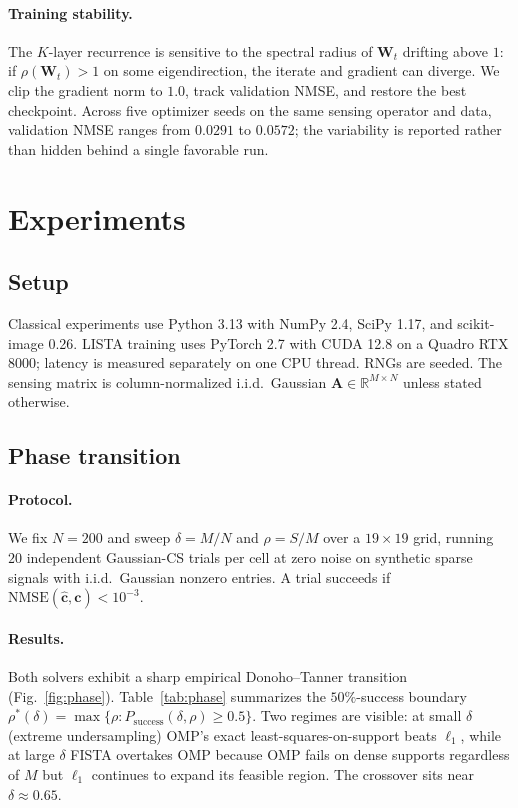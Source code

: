\documentclass{article}
\begin{document}
\paragraph{Training stability.} The $K$-layer recurrence is sensitive to the spectral radius of $\boldsymbol{W}_t$ drifting above $1$: if $\rho(\boldsymbol{W}_t) > 1$ on some eigendirection, the iterate and gradient can diverge. We clip the gradient norm to $1.0$, track validation NMSE, and restore the best checkpoint. Across five optimizer seeds on the same sensing operator and data, validation NMSE ranges from $0.0291$ to $0.0572$; the variability is reported rather than hidden behind a single favorable run.

\section{Experiments}
\label{sec:experiments}

\subsection{Setup}

Classical experiments use Python 3.13 with NumPy 2.4, SciPy 1.17, and scikit-image 0.26. LISTA training uses PyTorch 2.7 with CUDA 12.8 on a Quadro RTX 8000; latency is measured separately on one CPU thread. RNGs are seeded. The sensing matrix is column-normalized i.i.d.\ Gaussian $\boldsymbol{A} \in \mathbb{R}^{M \times N}$ unless stated otherwise.

\subsection{Phase transition}
\label{sec:phase}

\paragraph{Protocol.} We fix $N = 200$ and sweep $\delta = M/N$ and $\rho = S/M$ over a $19{\times}19$ grid, running $20$ independent Gaussian-CS trials per cell at zero noise on synthetic sparse signals with i.i.d.\ Gaussian nonzero entries. A trial succeeds if $\mathrm{NMSE}(\hat{\boldsymbol{c}}, \boldsymbol{c}) < 10^{-3}$.

\paragraph{Results.} Both solvers exhibit a sharp empirical Donoho--Tanner transition (Fig.~\ref{fig:phase}). Table~\ref{tab:phase} summarizes the $50\%$-success boundary $\rho^\ast(\delta) = \max\{\rho : P_\text{success}(\delta,\rho) \ge 0.5\}$. Two regimes are visible: at small $\delta$ (extreme undersampling) OMP's exact least-squares-on-support beats $\ell_1$, while at large $\delta$ FISTA overtakes OMP because OMP fails on dense supports regardless of $M$ but $\ell_1$ continues to expand its feasible region. The crossover sits near $\delta \approx 0.65$.
\end{document}
